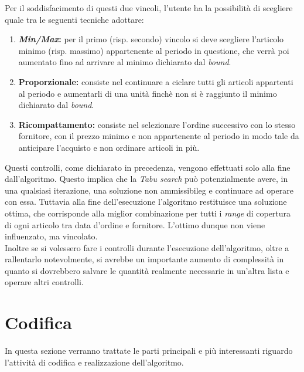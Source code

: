Per il soddisfacimento di questi due vincoli, l'utente ha la
possibilità di scegliere quale tra le seguenti tecniche adottare:
\begin{enumerate}
    \item \textbf{\textit{Min/Max}:} per il primo (risp. secondo) vincolo
    si deve scegliere l'articolo minimo (risp. massimo) appartenente al periodo in questione,
    che verrà poi aumentato fino ad arrivare al
    minimo dichiarato dal \textit{bound}.
    \item \textbf{Proporzionale:} consiste nel continuare a ciclare
    tutti gli articoli appartenti al periodo e aumentarli di
    una unità finchè non si è raggiunto il minimo
    dichiarato dal \textit{bound}.
    \item \textbf{Ricompattamento:} consiste nel selezionare l'ordine
    successivo con lo stesso fornitore, con il prezzo minimo e
    non appartenente al periodo in modo tale da anticipare l'acquisto
    e non ordinare articoli in più.
\end{enumerate}
\vspace*{0.5cm}
\noindent Questi controlli, come dichiarato in precedenza, vengono effettuati solo alla fine dall'algoritmo.
Questo implica che la \textit{Tabu search} può potenzialmente avere, in
una qualsiasi iterazione, una soluzione non \gls{ammissibileg} e
continuare ad operare con essa. Tuttavia alla fine dell'esecuzione
l'algoritmo restituisce una soluzione ottima, che corrisponde
alla miglior combinazione per tutti i \textit{range} di copertura di
ogni articolo tra data d'ordine e fornitore. L'ottimo dunque non viene
influenzato, ma vincolato.\\
Inoltre se si volessero fare i controlli durante l'esecuzione dell'algoritmo,
oltre a rallentarlo notevolmente, si avrebbe un importante aumento di
complessità in quanto si dovrebbero salvare le quantità realmente
necessarie in un'altra lista e operare altri controlli.

\newpage

\section{Codifica}
\label{sec:codifica}
\noindent In questa sezione verranno trattate le parti principali e più interessanti riguardo l'attività
di codifica e realizzazione dell'algoritmo.

